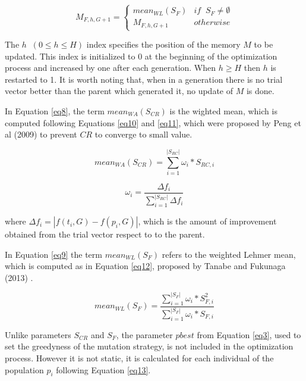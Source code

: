 \documentclass[review]{elsarticle}
\begin{document}
\begin{equation}
M_{F,h,G+1} = \left\{ \begin{array}{lc}
mean_{WL} (S_{F}) &   if \;\; S_{F} \neq \emptyset \\
M_{F,h,G+1} &  otherwise
\end{array}
\right.
\label{eq9}
\end{equation}

The $h \;\; (0 \le h \le H)$ index specifies the position of the memory $M$ to be updated. This index is initialized to $0$ at the beginning of the optimization process and increased by one after each generation. When $h \ge H$ then $h$ is restarted to 1. It is worth noting that, when in a generation there is no trial vector better than the parent which generated it, no update of $M$ is done.

In Equation \ref{eq8}, the term $mean_{WA} (S_{CR})$ is the wighted mean,  which is computed following Equations \eqref{eq10} and \eqref{eq11}, which were proposed by Peng et al (2009) \cite{peng2009multi} to prevent $CR$ to converge to small value.

\begin{equation}
mean_{WA} (S_{CR}) = \sum_{i = 1}^{|S_{RC}|} \omega_i * S_{RC,i}
\label{eq10}
\end{equation}

\begin{equation}
\omega_i = \frac{\Delta f_i}{\sum_{i = 1}^{|S_{RC}|} \Delta f_i}
\label{eq11}
\end{equation}

where $\Delta f_i = |f(t_i,G) - f(p_i, G)|$, which is the amount of improvement obtained from the trial vector respect to to the parent.

In Equation \ref{eq9} the term $mean_{WL} (S_{F})$ refers to the weighted Lehmer mean, which is computed as in Equation \eqref{eq12}, proposed by Tanabe and Fukunaga (2013) \cite{tanabe2013success}.

\begin{equation}
mean_{WL} (S_{F}) = \frac{\sum_{i = 1}^{|S_{F}|} \omega_i * S^2_{F,i}}{\sum_{i = 1}^{|S_{F}|} \omega_i * S_{F,i}}
\label{eq12}
\end{equation}

Unlike parameters $S_{CR}$ and $S_F$, the parameter $pbest$ from Equation \eqref{eq3}, used to set the greedyness of the mutation strategy, is not included in the optimization process. However it is not static, it is calculated for each individual of the population $p_i$ following Equation \eqref{eq13}.
\end{document}
